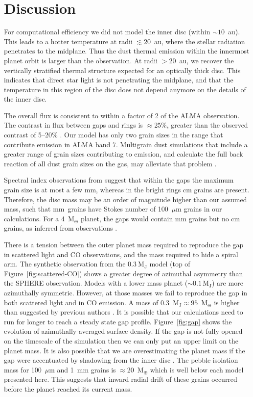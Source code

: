 \documentclass[usenatbib,a4paper,times]{mnras}
\renewcommand{\earth}{\mathrm{M}_{\oplus}}
\begin{document}
\section{Discussion}
\label{sec:discussion}

For computational efficiency we did not model the inner disc (within
$\sim10$~au). This leads to a hotter temperature at radii $\lesssim 20$~au,
where the stellar radiation penetrates to the midplane. Thus the dust thermal
emission within the innermost planet orbit is larger than the observation. At
radii $>20$~au, we recover the vertically stratified thermal structure expected
for an optically thick disc. This indicates that direct star light is not
penetrating the midplane, and that the temperature in this region of the disc
does not depend anymore on the details of the inner disc.

The overall flux is consistent to within a factor of 2 of the ALMA observation.
The contrast in flux between gaps and rings is $\approx$25\%, greater than the
observed contrast of 5--20$\%$ \citep{andrews:2016}. Our model has only two
grain sizes in the range that contribute emission in ALMA band 7.  Multigrain
dust simulations that include a greater range of grain sizes contributing to
emission, and calculate the full back reaction of all dust grain sizes on the
gas, may alleviate that problem \citep{hutchison:2018}.

Spectral index observations from \citet{huang:2018} suggest that within the gaps
the maximum grain size is at most a few mm, whereas in the bright rings cm
grains are present. Therefore, the disc mass may be an order of magnitude higher
than our assumed mass, such that mm~grains have Stokes number of 100~$\mu$m
grains in our calculations. For a 4~$\earth{}$ planet, the gaps would contain mm
grains but no cm grains, as inferred from observations \citep{huang:2018}.

There is a tension between the outer planet mass required to reproduce the gap
in scattered light and CO observations, and the mass required to hide a spiral
arm. The synthetic observation from the $0.3~\mathrm{M_J}$ model (top of
Figure~\ref{fig:scattered-CO}) shows a greater degree of azimuthal asymmetry
than the SPHERE observation. Models with a lower mass planet ($\sim
0.1\,\mathrm{M_J}$) are more azimuthally symmetric. However, at those masses we
fail to reproduce the gap in both scattered light and in CO emission. A mass of
0.3~$\mathrm{M_J} \approx 95$~$\earth{}$ is higher than suggested by previous
authors \citep{dong:2017b, van-boekel:2017}. It is possible that our
calculations need to run for longer to reach a steady state gap profile.
Figure~\ref{fig:gap} shows the evolution of azimuthally-averaged surface
density. If the gap is not fully opened on the timescale of the simulation then
we can only put an upper limit on the planet mass. It is also possible that we
are overestimating the planet mass if the gap were accentuated by shadowing from
the inner disc \citep{debes:2013, debes:2017, poteet:2018}.  The pebble
isolation mass \citep{bitsch:2018} for 100~$\mu$m and 1~mm grains is
$\approx$20~$\earth{}$ which is well below each model presented here.  This
suggests that inward radial drift of these grains occurred before the planet
reached its current mass.
\end{document}
